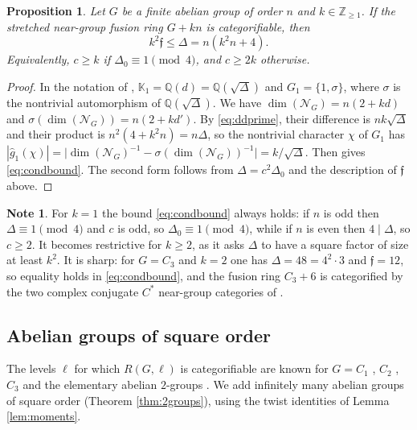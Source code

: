 \documentclass[10pt]{article}
\theoremstyle{plain}
\newtheorem{proposition}[theorem]{Proposition}
\theoremstyle{definition}
\newtheorem{note}[theorem]{Note}
\theoremstyle{plain}
\begin{document}
\begin{proposition}\label{prop:conductor}
Let $G$ be a finite abelian group of order $n$ and $k\in\mathbb{Z}_{\geq1}$. If the stretched near-group fusion ring $G+kn$ is categorifiable, then
\begin{equation}\label{eq:condbound}
    k^2\mathfrak{f}\leq\Delta=n(k^2n+4).
\end{equation}
Equivalently, $c\geq k$ if $\Delta_0\equiv1\pmod4$, and $c\geq2k$ otherwise.
\end{proposition}

\begin{proof}
In the notation of \cite{schopieray2026dimensionblocksphericalfusion}, $\mathbb{K}_1=\mathbb{Q}(d)=\mathbb{Q}(\sqrt\Delta)$ and $G_1=\{1,\sigma\}$, where $\sigma$ is the nontrivial automorphism of $\mathbb{Q}(\sqrt\Delta)$. We have $\dim(\mathcal{N}_G)=n(2+kd)$ and $\sigma(\dim(\mathcal{N}_G))=n(2+kd')$. By \eqref{eq:ddprime}, their difference is $nk\sqrt\Delta$ and their product is $n^2(4+k^2n)=n\Delta$, so the nontrivial character $\chi$ of $G_1$ has $|\hat g_1(\chi)|=\bigl|\dim(\mathcal{N}_G)^{-1}-\sigma(\dim(\mathcal{N}_G))^{-1}\bigr|=k/\sqrt\Delta$. Then \cite[Theorem 5.1]{schopieray2026dimensionblocksphericalfusion} gives \eqref{eq:condbound}. The second form follows from $\Delta=c^2\Delta_0$ and the description of $\mathfrak{f}$ above.
\end{proof}

\begin{note}\label{rem:conductor}
For $k=1$ the bound \eqref{eq:condbound} always holds: if $n$ is odd then $\Delta\equiv1\pmod4$ and $c$ is odd, so $\Delta_0\equiv1\pmod4$, while if $n$ is even then $4\mid\Delta$, so $c\geq2$. It becomes restrictive for $k\geq2$, as it asks $\Delta$ to have a square factor of size at least $k^2$. It is sharp: for $G=C_3$ and $k=2$ one has $\Delta=48=4^2\cdot3$ and $\mathfrak{f}=12$, so equality holds in \eqref{eq:condbound}, and the fusion ring $C_3+6$ is categorified by the two complex conjugate $C^\ast$ near-group categories of \cite[Theorem 10.19]{MR3635673}.
\end{note}

\subsection{Abelian groups of square order}\label{subsec:2groups}

The levels $\ell$ for which $R(G,\ell)$ is categorifiable are known for $G=C_1$ \cite{MR1981895}, $C_2$ \cite{MR3427429}, $C_3$ \cite[Section 4]{MR3229513} and the elementary abelian $2$-groups \cite[Theorem 1.1]{MR4655273}. We add infinitely many abelian groups of square order (Theorem \ref{thm:2groups}), using the twist identities of Lemma \ref{lem:moments}.
\end{document}

